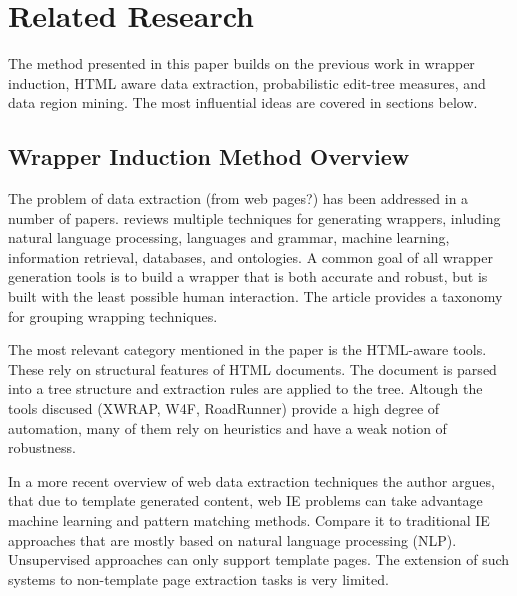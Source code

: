 \chapter{Related Research}




The method presented in this paper builds on the previous work in wrapper induction, HTML aware data extraction, probabilistic edit-tree measures, and data region mining. The most influential ideas are covered in sections below.


\section{Wrapper Induction Method Overview}

The problem of data extraction (from web pages?) has been addressed in a number of papers. \cite{Laender:2002:BSW:565117.565137} reviews multiple techniques for generating wrappers, inluding natural language processing, languages and grammar, machine learning, information retrieval, databases, and ontologies. A common goal of all wrapper generation tools is to build a wrapper that is both accurate and robust, but is built with the least possible human interaction. The article provides a taxonomy for grouping wrapping techniques.

The most relevant category mentioned in the paper is the HTML-aware tools. These rely on structural features of HTML documents. The document is parsed into a tree structure and extraction rules are applied to the tree. Altough the tools discused (XWRAP, W4F, RoadRunner) provide a high degree of automation, many of them rely on heuristics and have a weak notion of robustness.

In a more recent overview of web data extraction techniques \cite{Chang:2006:SWI:1159162.1159300} the author argues, that due to template generated content, web IE problems can take advantage machine learning and pattern matching methods. Compare it to traditional IE approaches that are mostly based on natural language processing (NLP). Unsupervised approaches can only support template pages. The extension of such systems to non-template page extraction tasks is very limited.


